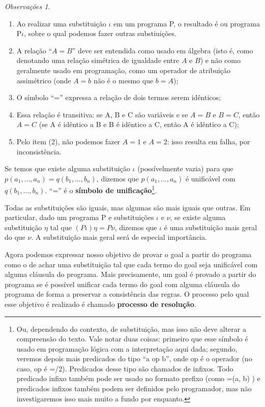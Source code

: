 \documentclass{article}
\theoremstyle{remark}
\newtheorem*{remark}{Observações}
\theoremstyle{theorem}
\begin{document}
\begin{remark}
  \hfill
  \begin{enumerate}
    \item Ao realizar uma substituição $\iota$ em um programa P, o resultado é ou programa P$\iota$, sobre o qual podemos fazer outras substiuições.
    \item A relação ``$A = B$'' deve ser entendida como usado em álgebra (isto é, como denotando uma relação simétrica de igualdade entre $A$ e $B$) e não como geralmente usado em programação, como um operador de atribuição assimétrico (onde $A = b$ não é o mesmo que $b = A$);
    \item O símbolo ``='' expressa a relação de dois termos serem idênticos;
    \item Essa relação é transitiva: se A, B e C são variáveis e se $A = B$ e $B = C$, então $A = C$ (se A é idêntico a B e B é idêntico a C, então A é idêntico a C);
    \item Pelo item (2), não podemos fazer $A = 1$ e $A = 2$: isso resulta em falha, por inconsistência.
  \end{enumerate}
\end{remark}

Se temos que existe alguma substituição $\iota$ (possívelmente vazia) para que $p(a_1, ..., a_n) = q(b_1, ..., b_n)$, dizemos que  $p(a_1, ..., a_n)$ é unificável com $q(b_1, ..., b_n)$. ``='' é o \textbf{símbolo de unificação}\footnote{Ou, dependendo do contexto, de substituição, mas isso não deve alterar a compreensão do texto. Vale notar duas coisas: primeiro que esse símbolo é usado em programação lógica com a interpretação aqui dada; segundo, veremos depois mais
  predicados do tipo ``a op b'', onde op é o operador (no caso, op é =/2). Predicados desse tipo são chamados de infixos. Todo predicado infixo também pode ser usado no formato prefixo (como =(a, b) ) e predicados infixos também podem ser definidos pelo programador, mas não investigaremos isso mais muito a fundo por enquanto.}.

Todas as substituições são iguais, mas algumas são mais iguais que outras. Em particular, dado um programa P e substituições $\iota$ e $\nu$, se existe alguma substituição $\eta$ tal que $(P\iota)\eta = P \nu$, dizemos que $\iota$ é uma substituição mais geral do que $\nu$. A substituição mais geral será de especial importância. %

Agora podemos expressar nosso objetivo de provar o goal a partir do programa como o de achar uma substituição tal que cada termo do goal seja unificável com alguma cláusula do programa. Mais precisamente, um goal é provado a partir do programa se é possível unificar cada termo do goal com alguma cláusula do programa de forma a preservar a consistência das regras. O processo pelo qual esse objetivo é realizado é chamado \textbf{processo de resolução}.
\end{document}
